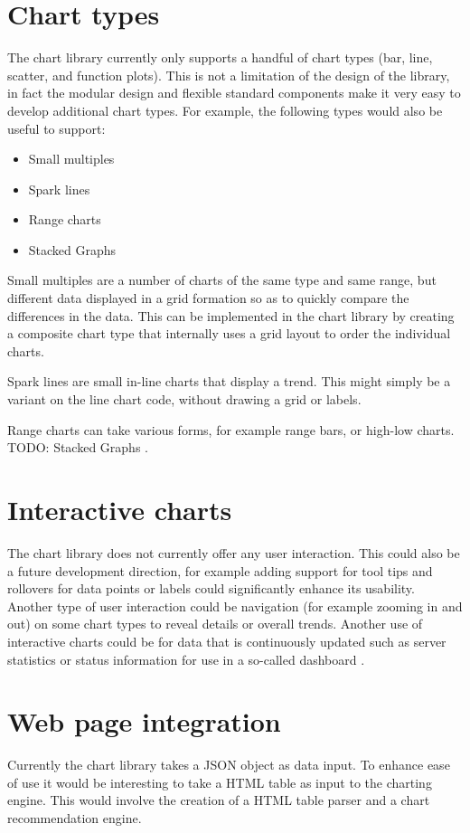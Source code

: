 \section{Chart types}
The chart library currently only supports a handful of chart types (bar, line, scatter, and function plots). This is not a limitation of the design of the library, in fact the modular design and flexible standard components make it very easy to develop additional chart types. For example, the following types would also be useful to support:
\begin{itemize}
\item Small multiples
\item Spark lines
\item Range charts
\item Stacked Graphs
\end{itemize}

Small multiples\cite{tufte01} are a number of charts of the same type and same range, but different data displayed in a grid formation so as to quickly compare the differences in the data. This can be implemented in the chart library by creating a composite chart type that internally uses a grid layout to order the individual charts. 

Spark lines\cite{tufte06} are small in-line charts that display a trend. This might simply be a variant on the line chart code, without drawing a grid or labels.

Range charts can take various forms, for example range bars, or high-low charts. 
TODO: Stacked Graphs \cite{byron08}.


\section{Interactive charts}
The chart library does not currently offer any user interaction. This could also be a future development direction, for example adding support for tool tips and rollovers for data points or labels could significantly enhance its usability. Another type of user interaction could be navigation (for example zooming in and out) on some chart types to reveal details or overall trends. Another use of interactive charts could be for data that is continuously updated such as server statistics or status information for use in a so-called dashboard \cite{few06}.

\section{Web page integration}
Currently the chart library takes a JSON object as data input. To enhance ease of use it would be interesting to take a HTML table as input to the charting engine. This would involve the creation of a HTML table parser and a chart recommendation engine. 

